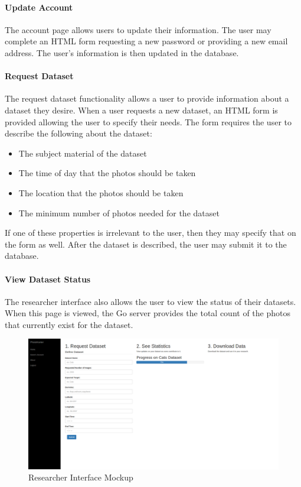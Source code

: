 \documentclass{article}
\begin{document}
\paragraph{Update Account}
The account page allows users to update their information. The user may
complete an HTML form requesting a new password or providing a new email
address. The user's information is then updated in the database.

\paragraph{Request Dataset}
The request dataset functionality allows a user to provide information about a
dataset they desire. When a user requests a new dataset, an HTML form is
provided allowing the user to specify their needs. The form requires the user
to describe the following about the dataset:
\begin{itemize}
  \item The subject material of the dataset
  \item The time of day that the photos should be taken
  \item The location that the photos should be taken
  \item The minimum number of photos needed for the dataset
\end{itemize}
If one of these properties is irrelevant to the user, then they may specify
that on the form as well. After the dataset is described, the user may submit
it to the database.

\paragraph{View Dataset Status}
The researcher interface also allows the user to view the status of their
datasets. When this page is viewed, the Go server provides the total count of
the photos that currently exist for the dataset.

\begin{figure}[H]
  \caption{Researcher Interface Mockup}
  \centering
  \includegraphics[width=\textwidth,height=\textheight,keepaspectratio]{researchers}
\end{figure}
\end{document}
